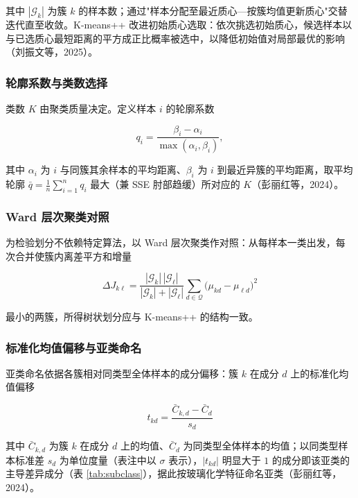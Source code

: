 \documentclass{ctexart}
\begin{document}
其中 $|\mathcal{G}_k|$ 为簇 $k$ 的样本数；通过"样本分配至最近质心—按簇均值更新质心"交替迭代直至收敛。K-means++ 改进初始质心选取：依次挑选初始质心，候选样本以与已选质心最短距离的平方成正比概率被选中，以降低初始值对局部最优的影响（刘振文等，2025）。


\subsubsection{轮廓系数与类数选择}

类数 $K$ 由聚类质量决定。定义样本 $i$ 的轮廓系数

\begin{equation*}
q_{i}=\frac{\beta_{i}-\alpha_{i}}{\max(\alpha_{i},\beta_{i})},
\end{equation*}

其中 $\alpha_{i}$ 为 $i$ 与同簇其余样本的平均距离、$\beta_{i}$ 为 $i$ 到最近异簇的平均距离，取平均轮廓 $\bar{q}=\frac{1}{n}\sum_{i=1}^{n}q_{i}$ 最大（兼 SSE 肘部趋缓）所对应的 $K$（彭丽红等，2024）。

\subsubsection{Ward 层次聚类对照}

为检验划分不依赖特定算法，以 Ward 层次聚类作对照：从每样本一类出发，每次合并使簇内离差平方和增量

\begin{equation*}
\Delta J_{k\ell}=\frac{|\mathcal{G}_k|\,|\mathcal{G}_\ell|}{|\mathcal{G}_k|+|\mathcal{G}_\ell|}\sum_{d\in\mathcal{Q}}\big(\mu_{kd}-\mu_{\ell d}\big)^{2}
\end{equation*}

最小的两簇，所得树状划分应与 K-means++ 的结构一致。


\subsubsection{标准化均值偏移与亚类命名}

亚类命名依据各簇相对同类型全体样本的成分偏移：簇 $k$ 在成分 $d$ 上的标准化均值偏移

\begin{equation*}
t_{kd}=\frac{\bar{C}_{k,d}-\bar{C}_{d}}{s_{d}}
\end{equation*}

其中 $\bar{C}_{k,d}$ 为簇 $k$ 在成分 $d$ 上的均值、$\bar{C}_{d}$ 为同类型全体样本的均值；以同类型样本标准差 $s_d$ 为单位度量（表注中以 $\sigma$ 表示），$|t_{kd}|$ 明显大于 $1$ 的成分即该亚类的主导差异成分（表 \ref{tab:subclass}），据此按玻璃化学特征命名亚类（彭丽红等，2024）。
\end{document}
